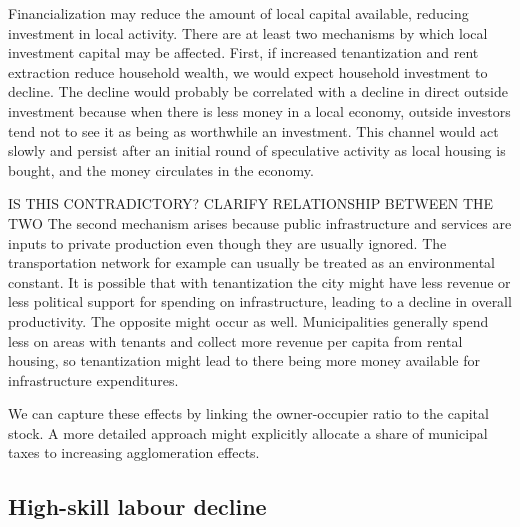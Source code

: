 Financialization may reduce the amount of local capital available, reducing investment in local activity. %
There are at least two mechanisms by which local investment capital may be affected. First, if increased tenantization and rent extraction reduce household wealth, we would expect household investment to decline. The decline would probably be correlated with a decline in direct outside investment because when there is less money in a local economy, outside investors tend not to see it as being as worthwhile an investment. %
This channel would act slowly and persist after an initial round of speculative activity as local housing is bought, and %
the money circulates in the economy. %


{\color{red} IS THIS CONTRADICTORY? CLARIFY RELATIONSHIP BETWEEN THE TWO}
The second mechanism arises because public infrastructure and services are inputs to private production even though they are usually ignored. The transportation network for example can usually be treated as an environmental constant. It is possible that with tenantization the city might have less revenue or less political support for spending on infrastructure, leading to a decline in overall productivity. The opposite might occur as well. 
Municipalities generally spend less on areas with tenants and collect more revenue per capita from rental housing, so tenantization might lead to there being more money available for %
infrastructure expenditures. 

We can capture these effects by linking the owner-occupier ratio to the capital stock. A more detailed approach might explicitly allocate a share of municipal taxes to increasing agglomeration effects.


\subsection{High-skill labour decline}

